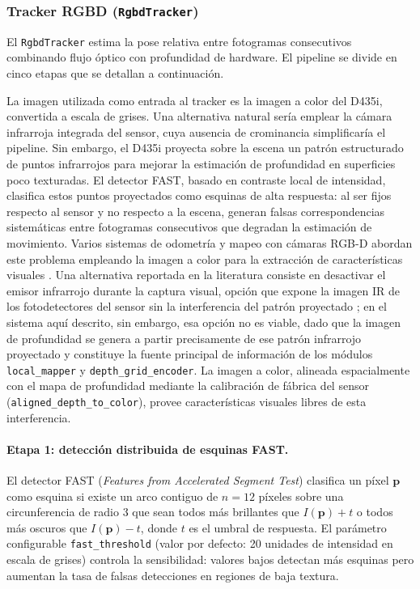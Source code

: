 \subsubsection{Tracker RGBD (\texttt{RgbdTracker})}

El \texttt{RgbdTracker} estima la pose relativa entre fotogramas consecutivos
combinando flujo óptico con profundidad de hardware. El pipeline se divide en
cinco etapas que se detallan a continuación.

La imagen utilizada como entrada al tracker es la imagen a color del D435i,
convertida a escala de grises. Una alternativa natural sería emplear
la cámara infrarroja integrada del sensor, cuya ausencia de crominancia
simplificaría el pipeline. Sin embargo, el D435i proyecta sobre la escena un
patrón estructurado de puntos infrarrojos para mejorar la estimación de
profundidad en superficies poco texturadas. El detector FAST, basado en
contraste local de intensidad, clasifica estos puntos proyectados como
esquinas de alta respuesta: al ser fijos respecto al sensor y no respecto a la
escena, generan falsas correspondencias sistemáticas entre fotogramas
consecutivos que degradan la estimación de movimiento. Varios sistemas de
odometría y mapeo con cámaras RGB-D abordan este problema empleando la imagen
a color para la extracción de características visuales
\cite{Endres2014, sturm12iros}. Una alternativa reportada en la literatura
consiste en desactivar el emisor infrarrojo durante la captura visual,
opción que expone la imagen IR de los fotodetectores del sensor sin la
interferencia del patrón proyectado \cite{IntelRealSenseDepthTuning}; en el
sistema aquí descrito, sin embargo, esa opción no es viable, dado que la
imagen de profundidad se genera a partir precisamente de ese patrón infrarrojo
proyectado y constituye la fuente principal de información de los módulos
\texttt{local\_mapper} y \texttt{depth\_grid\_encoder}. La imagen a color,
alineada espacialmente con el mapa de profundidad mediante la calibración de
fábrica del sensor (\texttt{aligned\_depth\_to\_color}), provee
características visuales libres de esta interferencia.

\paragraph{Etapa 1: detección distribuida de esquinas FAST.}

El detector FAST (\emph{Features from Accelerated Segment Test})
\cite{Rosten2006FAST} clasifica un píxel $\mathbf{p}$ como esquina si existe
un arco contiguo de $n = 12$ píxeles sobre una circunferencia de radio 3
que sean todos más brillantes que $I(\mathbf{p}) + t$ o todos más oscuros
que $I(\mathbf{p}) - t$, donde $t$ es el umbral de respuesta. El parámetro
configurable \texttt{fast\_threshold} (valor por defecto: 20 unidades de
intensidad en escala de grises) controla la sensibilidad: valores bajos
detectan más esquinas pero aumentan la tasa de falsas detecciones en regiones
de baja textura.


